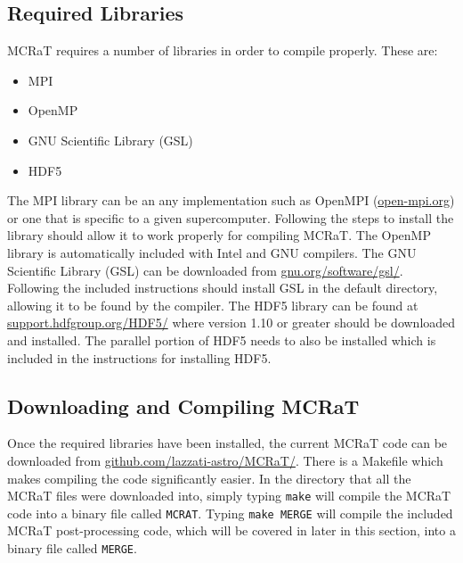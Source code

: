 \documentclass[12pt,a4paper]{article}
\begin{document}
\subsection{Required Libraries}
MCRaT requires a number of libraries in order to compile properly. These are:
\begin{itemize}
\item MPI
\item OpenMP
\item GNU Scientific Library (GSL)
\item HDF5
\end{itemize}

The MPI library can be an any implementation such as OpenMPI (\href{http://www.openmp.org/}{open-mpi.org}) or one that is specific to a given supercomputer. Following the steps to install the library should allow it to work properly for compiling MCRaT. The OpenMP library is automatically included with Intel and GNU compilers. The GNU Scientific Library (GSL) can be downloaded from \href{https://www.gnu.org/software/gsl/}{gnu.org/software/gsl/}. Following the included instructions should install GSL in the default directory, allowing it to be found by the compiler. The HDF5 library can be found at \href{https://support.hdfgroup.org/HDF5/}{support.hdfgroup.org/HDF5/} where version 1.10 or greater should be downloaded and installed. The parallel portion of HDF5 needs to also be installed which is included in the instructions for installing HDF5.

\subsection{Downloading and Compiling MCRaT}
Once the required libraries have been installed, the current MCRaT code can be downloaded from \href{https://github.com/lazzati-astro/MCRaT/tree/master/HYBRID_PARALLEL_KN}{github.com/lazzati-astro/MCRaT/}. There is a Makefile which  makes compiling the code significantly easier. In the directory that all the MCRaT files were downloaded into, simply typing \texttt{make} will compile the MCRaT code into a binary file called \texttt{MCRAT}. Typing \texttt{make MERGE} will compile the included MCRaT post-processing code, which will be covered in later in this section, into a binary file called \texttt{MERGE}.
\end{document}
